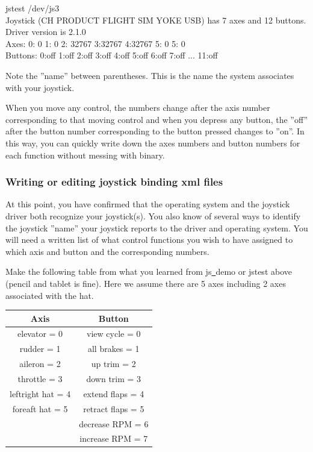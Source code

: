 \begin{ttfamily}
\tiny
\noindent
jstest /dev/js3\\
Joystick (CH PRODUCT FLIGHT SIM YOKE USB) has 7 axes and 12 buttons. Driver version is 2.1.0\\
Axes:  0:      0   1:      0   2: 32767  3:32767  4:32767  5:      0  5:      0\\
Buttons:  0:off  1:off  2:off  3:off  4:off  5:off  6:off  7:off  ...  11:off\\
\end{ttfamily}

\noindent
Note the ''name'' between parentheses.  This is the name the system associates with your joystick.

When you move any control, the numbers change after the axis number corresponding to that moving control and when you depress any button, the ''off'' after the button number corresponding to the button pressed changes to ''on''.  In this way, you can quickly write down the axes numbers and button numbers for each function without messing with binary.  

\subsubsection{Writing or editing joystick binding xml files\label{writing}}
At this point, you have confirmed that the operating system and the joystick driver both recognize your joystick(s).  You also know of several ways to identify the joystick ''name'' your joystick reports to the driver and operating system.  You will need a written list of what control functions you wish to have assigned to which axis and button and the corresponding numbers.  

 Make the following table from what you learned from js\underline{~}demo or jstest above (pencil and tablet is fine).  Here we assume there are 5 axes including 2 axes associated with the hat.
\medskip

\begin{tabular}{c|c}
		Axis			      &           Button\\\hline
	elevator 	= 0	     &     	view cycle 	= 0\\
	rudder 		= 1	     &     	all brakes 	= 1\\
	aileron 	= 2	     &      	up trim 	= 2\\
	throttle 	= 3		   &       down trim 	= 3\\
	leftright hat 	= 4&	    	extend flaps	= 4\\
	foreaft hat 	= 5	&	      retract flaps	= 5\\
					          &        decrease RPM	= 6\\
					          &        increase RPM	= 7
\end{tabular}
\medskip


